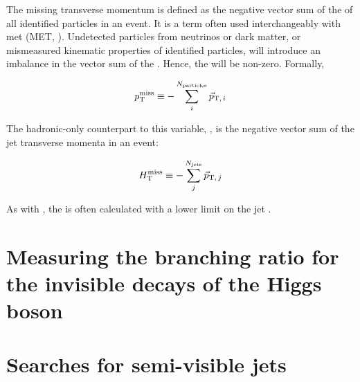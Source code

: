The missing transverse momentum \ptmiss is defined as the negative vector sum of the \pt of all identified particles in an event. It is a term often used interchangeably with \gls{met} (MET, ). Undetected particles from neutrinos or dark matter, or mismeasured kinematic properties of identified particles, will introduce an imbalance in the vector sum of the \pt. Hence, the \ptmiss will be non-zero. Formally,

\begin{equation}
    p_{\mathrm{T}}^\text{miss} \equiv - \sum_i^{N_{\mathrm{particles}}} {\vec p}_{\mathrm{T}, \, i}
    \label{eq:met_definition}
\end{equation}

The hadronic-only counterpart to this variable, \mht, is the negative vector sum of the jet transverse momenta in an event:

\begin{equation}
    H_{\mathrm{T}}^{\text{miss}} \equiv - \sum_j^{N_{\mathrm{jets}}} {\vec p}_{\mathrm{T}, \, j}
    \label{eq:mht_definition}
\end{equation}

As with \HT, the \mht is often calculated with a lower limit on the jet \pt.





\section{Measuring the branching ratio for the invisible decays of the Higgs boson}
\label{sec:theory_higgs_to_inv}





\section{Searches for semi-visible jets}
\label{sec:theory_svj}


